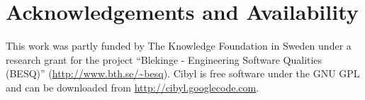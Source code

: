 \section*{Acknowledgements and Availability}
This work was partly funded by The Knowledge Foundation in Sweden under a
research grant for the project ``Blekinge - Engineering Software Qualities
(BESQ)'' (\url{http://www.bth.se/~besq}). Cibyl is free software under the GNU
GPL and can be downloaded from \url{http://cibyl.googlecode.com}.

